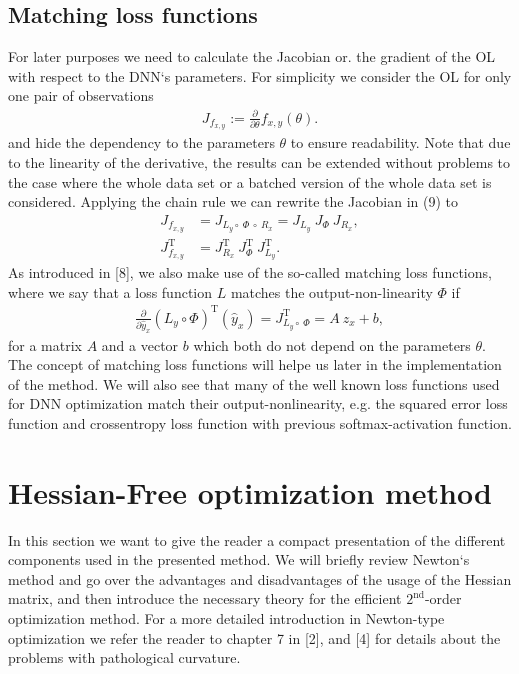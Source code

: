 \documentclass[conference]{IEEEtran}
\begin{document}
\subsection{Matching loss functions}
For later purposes we need to calculate the Jacobian or. the gradient of the OL with respect to the DNN`s parameters. For simplicity we consider the OL for only one pair of observations
\begin{align}
J_{f_{x, y}} := \frac{\partial}{\partial\theta}f_{x, y}(\theta).
\end{align}
and hide the dependency to the parameters $\theta$ to ensure readability.
Note that due to the linearity of the derivative, the results can be extended without problems to the case where the whole data set or a batched version of the whole data set is considered.
Applying the chain rule we can rewrite the Jacobian in (9) to
\begin{align}
J_{f_{x, y}} &= J_{L_{y}\circ \:\Phi \:\circ\:R_{x}} = J_{L_{y}} \: J_{\Phi} \: J_{R_{x}},\\
J_{f_{x, y}}^{\mathrm{T}} &= J_{R_{x}}^{\mathrm{T}} \: J_{\Phi}^{\mathrm{T}} \: J_{L_{y}}^{\mathrm{T}}.
\end{align}
As introduced in [8], we also make use of the so-called matching loss functions, where we say that a loss function $L$ matches the output-non-linearity $\Phi$ if
\begin{align}
\frac{\partial}{\partial\hat{y}_{x}}\left(L_{y}\circ \Phi\right)^{\mathrm{T}}(\hat{y}_{x})= J_{L_{y}\circ \:\Phi}^{\mathrm{T}} = A\: z_{x} + b,
\end{align}
for a matrix $A$ and a vector $b$ which both do not depend on the parameters $\theta$.
The concept of matching loss functions will helpe us later in the implementation of the method. We will also see that many of the well known loss functions used for DNN optimization match their output-nonlinearity, e.g. the squared error loss function and crossentropy loss function with previous softmax-activation function.


\section{Hessian-Free optimization method}
In this section we want to give the reader a compact presentation of the different components used in the presented method. We will briefly review Newton`s method and go over the advantages and disadvantages of the usage of the Hessian matrix, and then introduce the necessary theory for the efficient $2^{\text{nd}}$-order optimization method. For a more detailed introduction in Newton-type optimization we refer the reader to chapter 7 in [2], and [4] for details about the problems with pathological curvature. 
\end{document}
